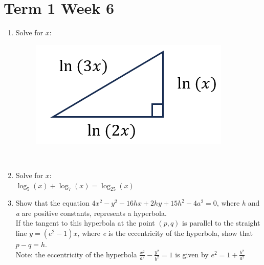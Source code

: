 \documentclass[../main.tex]{subfiles}
\begin{document}
\section*{Term 1 Week 6}
\begin{enumerate}
    \item 
    Solve for \(x\):\\
    \begin{figure}[h]
        \centering
        \includegraphics{images/t1w6q1.png}
    \end{figure}\\

    \item 
    Solve for \(x\):\\

    \setlength{\parindent}{30pt}
    \(\log_5(x)+\log_7(x)=\log_{25}(x)\)\\

    \item 
    Show that the equation \(4x^2-y^2-16hx+2hy+15h^2-4a^2=0\), where \textit{h} and \textit{a} are positive constants, represents a hyperbola.\\
    
    \setlength{\parindent}{0pt}
    If the tangent to this hyperbola at the point \((p,q)\) is parallel to the straight line \(y=(e^2-1)x\), where \textit{e} is the eccentricity of the hyperbola, show that \(p-q=h \).\\

    Note: the eccentricity of the hyperbola \(\frac{x^2}{a^2}-\frac{y^2}{b^2}=1\) is given by \(e^2=1+\frac{b^2}{a^2}\)
    
\end{enumerate}
\end{document}

